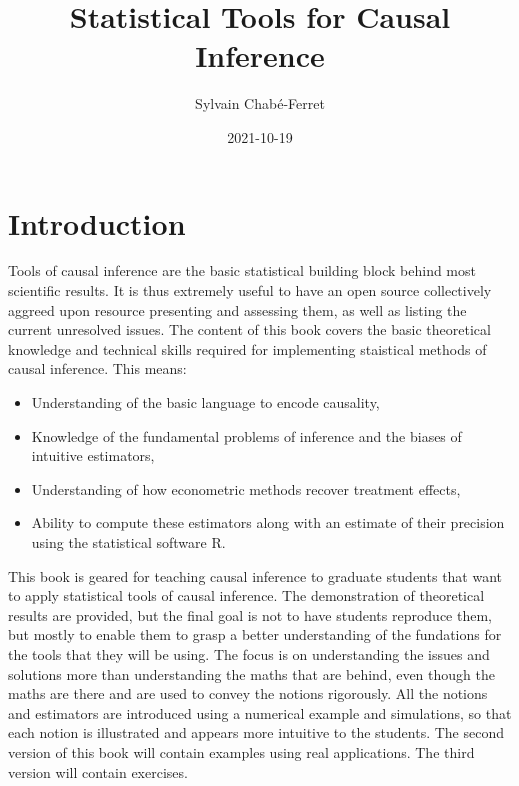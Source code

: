 \documentclass[
]{book}
\title{Statistical Tools for Causal Inference}
\author{Sylvain Chabé-Ferret}
\date{2021-10-19}
\providecommand{\tightlist}{%
  \setlength{\itemsep}{0pt}\setlength{\parskip}{0pt}}
\theoremstyle{definition}
\theoremstyle{definition}
\theoremstyle{definition}
\theoremstyle{definition}
\theoremstyle{remark}
\begin{document}
\maketitle

{
\setcounter{tocdepth}{0}
\tableofcontents
}
\hypertarget{introduction}{%
\chapter*{Introduction}\label{introduction}}

Tools of causal inference are the basic statistical building block behind most scientific results.
It is thus extremely useful to have an open source collectively aggreed upon resource presenting and assessing them, as well as listing the current unresolved issues.
The content of this book covers the basic theoretical knowledge and technical skills required for implementing staistical methods of causal inference.
This means:

\begin{itemize}
\tightlist
\item
  Understanding of the basic language to encode causality,
\item
  Knowledge of the fundamental problems of inference and the biases of intuitive estimators,
\item
  Understanding of how econometric methods recover treatment effects,
\item
  Ability to compute these estimators along with an estimate of their precision using the statistical software R.
\end{itemize}

This book is geared for teaching causal inference to graduate students that want to apply statistical tools of causal inference.
The demonstration of theoretical results are provided, but the final goal is not to have students reproduce them, but mostly to enable them to grasp a better understanding of the fundations for the tools that they will be using.
The focus is on understanding the issues and solutions more than understanding the maths that are behind, even though the maths are there and are used to convey the notions rigorously.
All the notions and estimators are introduced using a numerical example and simulations, so that each notion is illustrated and appears more intuitive to the students.
The second version of this book will contain examples using real applications.
The third version will contain exercises.
\end{document}
